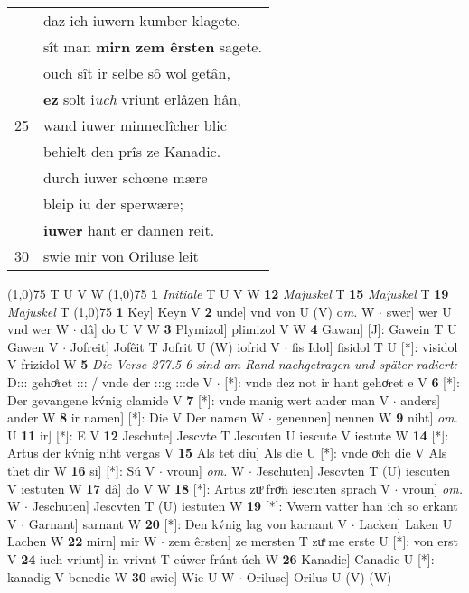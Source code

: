 \documentclass[8pt,a4paper,notitlepage]{article}
\begin{document}
\begin{table}[ht]
\begin{minipage}[t]{0.5\linewidth}
\begin{tabular}{rl}
 & daz ich iuwern kumber klagete,\\ 
 & sît man \textbf{mirn zem êrsten} sagete.\\ 
 & ouch sît ir selbe sô wol getân,\\ 
 & \textbf{ez} solt i\textit{uch} vriunt erlâzen hân,\\ 
25 & wand iuwer minneclîcher blic\\ 
 & behielt den prîs ze Kanadic.\\ 
 & durch iuwer schœne mære\\ 
 & bleip iu der sperwære;\\ 
 & \textbf{iuwer} hant er dannen reit.\\ 
30 & swie mir von Oriluse leit\\ 
\end{tabular}
\scriptsize
\line(1,0){75} \newline
T U V W \newline
\line(1,0){75} \newline
\textbf{1} \textit{Initiale} T U V W  \textbf{12} \textit{Majuskel} T  \textbf{15} \textit{Majuskel} T  \textbf{19} \textit{Majuskel} T  \newline
\line(1,0){75} \newline
\textbf{1} Key] Keyn V \textbf{2} unde] vnd von U (V) o\textit{m. } W  $\cdot$ swer] wer U vnd wer W  $\cdot$ dâ] do U V W \textbf{3} Plymizol] plimizol V W \textbf{4} Gawan] [J]: Gawein T U Gawen V  $\cdot$ Jofreit] Jofêit T Jofrit U (W) iofrid V  $\cdot$ fis Idol] fisidol T U [*]: visidol V frizidol W \textbf{5} \textit{Die Verse 277.5-6 sind am Rand nachgetragen und später radiert:} D::: gehoͤret ::: / vnde der :::g :::de V   $\cdot$ [*]: vnde dez not ir hant gehoͤret e V \textbf{6} [*]: Der gevangene kv́nig clamide V \textbf{7} [*]: vnde manig wert ander man V  $\cdot$ anders] ander W \textbf{8} ir namen] [*]: Die V Der namen W  $\cdot$ genennen] nennen W \textbf{9} niht] \textit{om.} U \textbf{11} ir] [*]: E V \textbf{12} Jeschute] Jescvte T Jescuten U iescute V iestute W \textbf{14} [*]: Artus der kv́nig niht vergas V \textbf{15} Als tet diu] Als die U [*]: vnde oͮch die V Als thet dir W \textbf{16} si] [*]: Sú V  $\cdot$ vroun] \textit{om.} W  $\cdot$ Jeschuten] Jescvten T (U) iescuten V iestuten W \textbf{17} dâ] do V W \textbf{18} [*]: Artus zuͦ froͮn iescuten sprach V  $\cdot$ vroun] \textit{om.} W  $\cdot$ Jeschuten] Jescvten T (U) iestuten W \textbf{19} [*]: Vwern vatter han ich so erkant V  $\cdot$ Garnant] sarnant W \textbf{20} [*]: Den kv́nig lag von karnant V  $\cdot$ Lacken] Laken U Lachen W \textbf{22} mirn] mir W  $\cdot$ zem êrsten] ze mersten T zuͦ me erste U [*]: von erst V \textbf{24} iuch vriunt] in vrivnt T eúwer frúnt úch W \textbf{26} Kanadic] Canadic U [*]: kanadig V benedic W \textbf{30} swie] Wie U W  $\cdot$ Oriluse] Orilus U (V) (W) \newline
\end{minipage}
\end{table}
\end{document}

